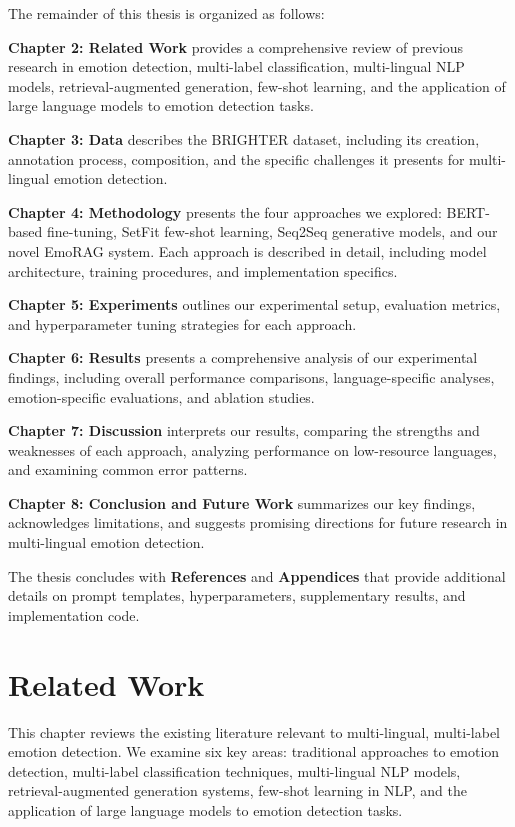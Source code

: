 \documentclass[a4paper,12pt]{extarticle}
\begin{document}
The remainder of this thesis is organized as follows:

\textbf{Chapter 2: Related Work} provides a comprehensive review of previous research in emotion detection, multi-label classification, multi-lingual NLP models, retrieval-augmented generation, few-shot learning, and the application of large language models to emotion detection tasks.

\textbf{Chapter 3: Data} describes the BRIGHTER dataset, including its creation, annotation process, composition, and the specific challenges it presents for multi-lingual emotion detection.

\textbf{Chapter 4: Methodology} presents the four approaches we explored: BERT-based fine-tuning, SetFit few-shot learning, Seq2Seq generative models, and our novel EmoRAG system. Each approach is described in detail, including model architecture, training procedures, and implementation specifics.

\textbf{Chapter 5: Experiments} outlines our experimental setup, evaluation metrics, and hyperparameter tuning strategies for each approach.

\textbf{Chapter 6: Results} presents a comprehensive analysis of our experimental findings, including overall performance comparisons, language-specific analyses, emotion-specific evaluations, and ablation studies.

\textbf{Chapter 7: Discussion} interprets our results, comparing the strengths and weaknesses of each approach, analyzing performance on low-resource languages, and examining common error patterns.

\textbf{Chapter 8: Conclusion and Future Work} summarizes our key findings, acknowledges limitations, and suggests promising directions for future research in multi-lingual emotion detection.

The thesis concludes with \textbf{References} and \textbf{Appendices} that provide additional details on prompt templates, hyperparameters, supplementary results, and implementation code.

\section{Related Work}

This chapter reviews the existing literature relevant to multi-lingual, multi-label emotion detection. We examine six key areas: traditional approaches to emotion detection, multi-label classification techniques, multi-lingual NLP models, retrieval-augmented generation systems, few-shot learning in NLP, and the application of large language models to emotion detection tasks.
\end{document}
